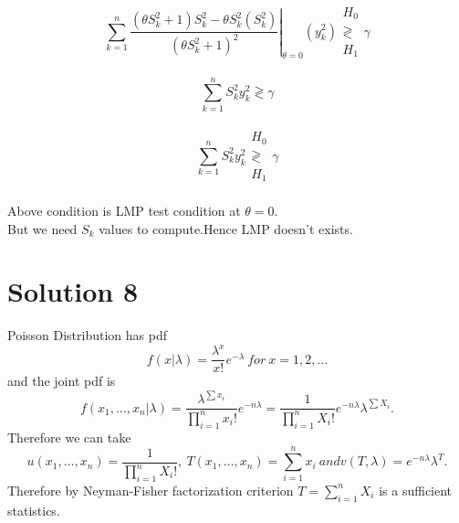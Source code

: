 \documentclass[a4paper,english,12pt]{article}
\begin{document}
$$\left.\sum\limits_{k=1}^n\frac{(\theta S_k^2+1)S_k^2-\theta S_k^2(S_k^2)}{(\theta S_k^2+1)^2}\right|_{\theta=0}(y_k^2)\substack{H_0\\\gtrless\\ H_1}\gamma$$\\
$$\sum\limits_{k=1}^nS_k^2y_k^2\gtrless\gamma$$\\
$$\sum\limits_{k=1}^nS_k^2y_k^2 \substack{H_0\\\gtrless\\ H_1} \gamma$$\\
Above condition is LMP test condition at $\theta=0$.\\
But we need $S_k$ values to compute.Hence LMP doesn't exists.

\section{Solution 8}
Poisson Distribution has pdf
\begin{equation*}
f(x|\lambda)=\frac{\lambda^x}{x!}e^{-\lambda} \ for \ x=1,2,\dots
\end{equation*}
and the joint pdf is
\begin{equation*}
f(x_1,\dots,x_n|\lambda)=\frac{\lambda^{\sum x_i}}{\prod_{i=1}^n x_i!}e^{-n\lambda}=\frac{1}{\prod_{i=1}^n X_i!}e^{-n\lambda}\lambda^{\sum X_i}.
\end{equation*}
Therefore we can take
\begin{equation*}
u(x_1,\dots,x_n)=\frac{1}{\prod_{i=1}^n X_i!}, \ T(x_1,\dots,x_n)=\sum_{i=1}^n  x_i \ and v(T,\lambda)=e^{-n\lambda}\lambda^T.
\end{equation*}
Therefore by Neyman-Fisher factorization criterion $T=\sum_{i=1}^n X_i$ is a sufficient statistics.
\end{document}
